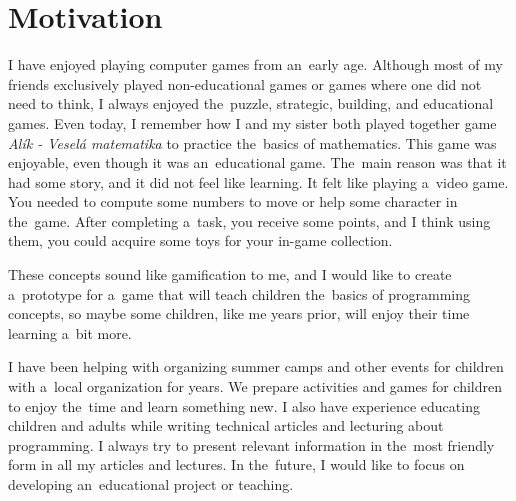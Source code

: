 \section{Motivation}

I have enjoyed playing computer games from an~early age.
Although most of my friends exclusively played non-educational games or games where one did not need to think, I always enjoyed the~puzzle, strategic, building, and educational games.
Even today, I remember how I and my sister both played together game \emph{Alík - Veselá matematika} to practice the~basics of mathematics.
This game was enjoyable, even though it was an~educational game.
The~main reason was that it had some story, and it did not feel like learning.
It felt like playing a~video game.
You needed to compute some numbers to move or help some character in the~game.
After completing a~task, you receive some points, and I think using them, you could acquire some toys for your in-game collection.

These concepts sound like gamification to me, and I would like to create a~prototype for a~game that will teach children the~basics of programming concepts, so maybe some children, like me years prior, will enjoy their time learning a~bit more.

I have been helping with organizing summer camps and other events for children with a~local organization for years.
We prepare activities and games for children to enjoy the~time and learn something new.
I also have experience educating children and adults while writing technical articles and lecturing about programming.
I always try to present relevant information in the~most friendly form in all my articles and lectures.
In the~future, I would like to focus on developing an~educational project or teaching.
